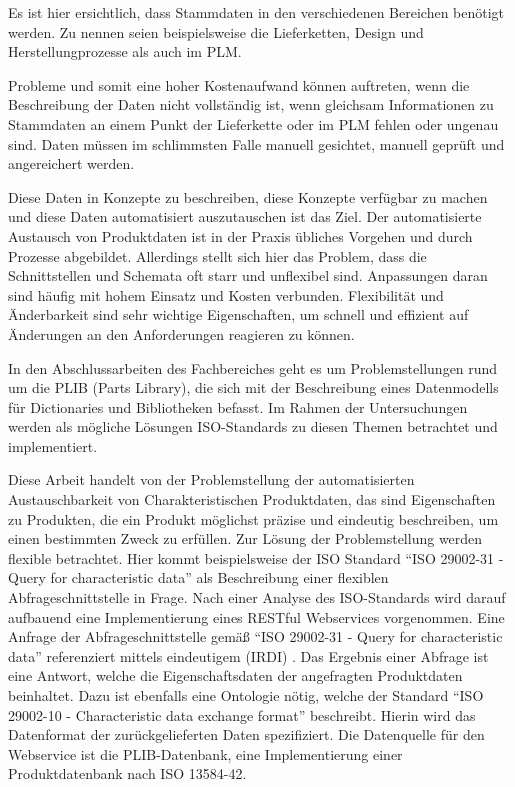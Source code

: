 Es ist hier ersichtlich, dass Stammdaten in den verschiedenen Bereichen benötigt werden. Zu nennen seien beispielsweise die Lieferketten, Design und Herstellungprozesse als auch im \gls{PLM}.     

Probleme und somit eine hoher Kostenaufwand können auftreten, wenn die Beschreibung der Daten nicht vollständig ist, wenn gleichsam Informationen zu Stammdaten an einem Punkt der Lieferkette oder im \gls{PLM} fehlen oder ungenau sind. Daten müssen im schlimmsten Falle manuell gesichtet, manuell geprüft und angereichert werden.  

Diese Daten in Konzepte zu beschreiben, diese Konzepte verfügbar zu machen und diese Daten automatisiert auszutauschen ist das Ziel. Der automatisierte Austausch von Produktdaten ist in der Praxis übliches Vorgehen und durch Prozesse abgebildet. Allerdings stellt sich hier das Problem, dass die Schnittstellen und Schemata oft starr und unflexibel sind. Anpassungen daran sind häufig mit hohem Einsatz und Kosten verbunden. Flexibilität und Änderbarkeit sind sehr wichtige Eigenschaften, um schnell und effizient auf Änderungen an den Anforderungen reagieren zu können. 

In den Abschlussarbeiten des Fachbereiches geht es um Problemstellungen rund um die \gls{PLIB} (Parts Library), die sich mit der Beschreibung eines Datenmodells für Dictionaries und Bibliotheken befasst. Im Rahmen der Untersuchungen werden als mögliche Lösungen ISO-Standards zu diesen Themen betrachtet und implementiert. 

Diese Arbeit handelt von der Problemstellung der automatisierten Austauschbarkeit von Charakteristischen Produktdaten, das sind Eigenschaften zu Produkten, die ein Produkt möglichst präzise und eindeutig beschreiben, um einen bestimmten Zweck zu erfüllen. Zur Lösung der Problemstellung werden flexible  betrachtet. Hier kommt beispielsweise der ISO Standard \enquote{ISO 29002-31 - Query for characteristic data} als Beschreibung einer flexiblen \gls{Abfrageschnittstelle} in Frage. Nach einer Analyse des ISO-Standards wird darauf aufbauend eine Implementierung eines \gls{REST}ful \glspl{Webservice} vorgenommen. 
Eine Anfrage der \gls{Abfrageschnittstelle} gemäß \enquote{ISO 29002-31 - Query for characteristic data} referenziert mittels eindeutigem  (IRDI) . Das Ergebnis einer Abfrage ist eine Antwort, welche die Eigenschaftsdaten der angefragten Produktdaten beinhaltet. Dazu ist ebenfalls eine Ontologie nötig, welche der Standard \enquote{ISO 29002-10 - Characteristic data exchange format} beschreibt. Hierin wird das Datenformat der zurückgelieferten Daten spezifiziert. Die Datenquelle für den Webservice ist die PLIB-Datenbank, eine Implementierung einer Produktdatenbank nach ISO 13584-42. 


